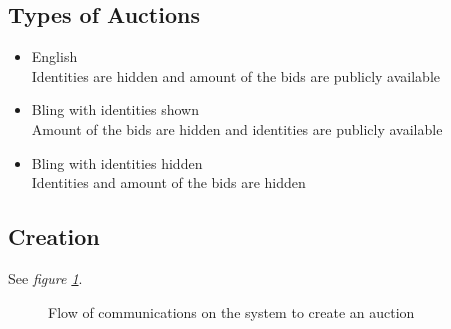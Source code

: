 \documentclass[12pt]{article}
\begin{document}
\subsection{Types of Auctions}
\label{subsec:typesOfAuctions}
\begin{itemize}
    \item English \\
      Identities are hidden and amount of the bids are publicly available
    \item Bling with identities shown \\
      Amount of the bids are hidden and identities are publicly available
    \item Bling with identities hidden \\
      Identities and amount of the bids are hidden
\end{itemize}

\subsection{Creation}
\label{subsec:auctionCreation}

See \textit{figure \ref{fig:auctionCreation}}.

\begin{figure}[h]
  \caption{Flow of communications on the system to create an auction}
  \label{fig:auctionCreation}
\end{figure}
\end{document}
